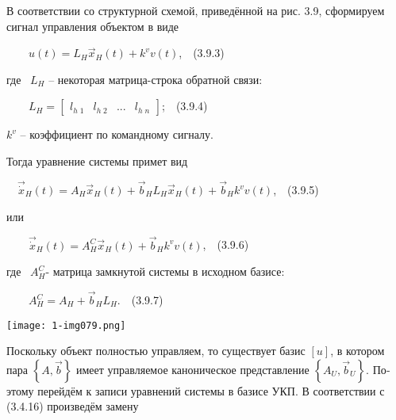 \documentclass[a4paper]{article}
\begin{document}
{\begin{russian}\sffamily
В соответствии со структурной схемой, приведённой на рис. 3.9, сформируем сигнал управления объектом в виде
\end{russian}}

{\begin{russian}\sffamily
\ \ \ \  $u(t)=L_H\vec x_H(t)+k^vv(t)$,\ \ (3.9.3)
\end{russian}}

{\begin{russian}\sffamily
где \  $L_H$ – некоторая матрица-строка обратной связи:
\end{russian}}

{\begin{russian}\sffamily
\ \ \ \  $L_H=\left[\begin{matrix}l_{h\;1}&l_{h\;2}&...&l_{h\;n}\end{matrix}\right]$;\ \ (3.9.4)
\end{russian}}

{\begin{russian}\sffamily
 $k^v$ – коэффициент по командному сигналу.
\end{russian}}

{\begin{russian}\sffamily
Тогда уравнение системы примет вид
\end{russian}}

{\begin{russian}\sffamily
\ \  $\vec{\dot x}_H(t)=A_H\vec x_H(t)+\vec b_HL_H\vec x_H(t)+\vec b_Hk^vv(t)$,\ \ (3.9.5)
\end{russian}}

{\begin{russian}\sffamily
или
\end{russian}}

{\begin{russian}\sffamily
\ \ \ \  $\vec{\dot x}_H(t)=A_H^C\vec x_H(t)+\vec b_Hk^vv(t)$,\ \ (3.9.6)
\end{russian}}

{\begin{russian}\sffamily
где \  $A_H^C$- матрица замкнутой системы в исходном базисе:
\end{russian}}

{\begin{russian}\sffamily
\ \ \ \  $A_H^C=A_H+\vec b_HL_H$.\ \ (3.9.7)
\end{russian}}


\bigskip

{\centering  \texttt{[image: 1-img079.png]} \par}
{\begin{russian}\sffamily
Поскольку объект полностью управляем, то существует базис  $[u]$, в котором пара  $\left\{A,\vec b\right\}$ имеет
управляемое каноническое представление  $\left\{A_U,\vec b_U\right\}$. Поэтому перейдём к записи уравнений системы в
базисе УКП. В соответствии с (3.4.16) произведём замену 
\end{russian}}
\end{document}
